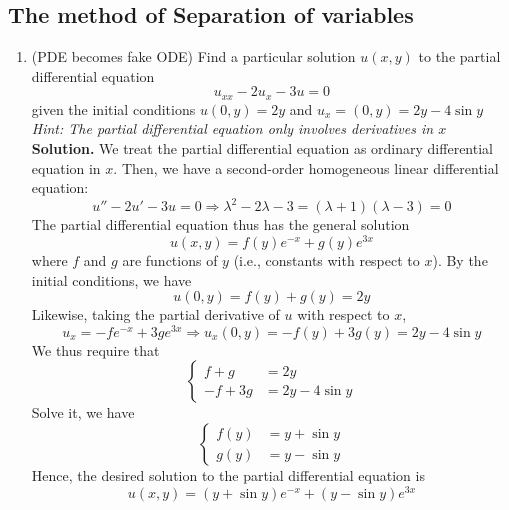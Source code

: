 \documentclass{article}
\begin{document}
\subsection{The method of Separation of variables}
\begin{enumerate}
    \item (PDE becomes fake ODE) Find a particular solution $u(x,y)$ to the partial differential equation
    \begin{equation*}
        u_{xx}-2u_x-3u=0
    \end{equation*}
    given the initial conditions $u(0,y)=2y$ and $u_x=(0,y)=2y-4\sin y$ \textit{Hint: The partial differential equation only involves derivatives in $x$}
    \textbf{Solution.}  We treat the partial differential equation as ordinary differential equation in $x$. Then, we have a second-order homogeneous linear differential equation:
    \begin{equation*}
        u''-2u'-3u=0\Rightarrow \lambda^2-2\lambda-3=(\lambda+1)(\lambda-3)=0
    \end{equation*}
    The partial differential equation thus has the general solution
    \begin{equation*}
        u(x,y)=f(y)e^{-x}+g(y)e^{3x}
    \end{equation*}
    where $f$ and $g$ are functions of $y$ (i.e., constants with respect to $x$). By the initial conditions, we have
    \begin{equation*}
        u(0,y)=f(y)+g(y)=2y
    \end{equation*}
    Likewise, taking the partial derivative of $u$ with respect to $x$,
    \begin{equation*}
        u_x=-fe^{-x}+3ge^{3x}\Rightarrow u_x(0,y)=-f(y)+3g(y)=2y-4\sin y
    \end{equation*}
    We thus require that
    \begin{equation*}
        \begin{cases}
            f+g&=2y\\
            -f+3g&=2y-4\sin y
        \end{cases}
    \end{equation*}
    Solve it, we have
    \begin{equation*}
        \begin{cases}
            f(y)&=y+\sin y \\
            g(y)&=y-\sin y
        \end{cases}
    \end{equation*}
    Hence, the desired solution to the partial differential equation is
    \begin{equation*}
        u(x,y)=(y+\sin y)e^{-x}+(y-\sin y)e^{3x}
    \end{equation*}
\end{enumerate}
\end{document}
